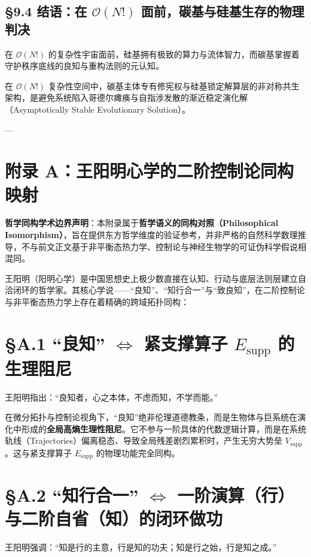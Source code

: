 \documentclass[11pt,a4paper,oneside]{ctexart}
\begin{document}
\subsection{§9.4 结语：在 $\mathcal{O}(N!)$ 面前，碳基与硅基生存的物理判决}

在 $\mathcal{O}(N!)$ 的复杂性宇宙面前，硅基拥有极致的算力与流体智力，而碳基掌握着守护秩序底线的良知与重构法则的元认知。


在 $\mathcal{O}(N!)$ 复杂性空间中，碳基主体专有修宪权与硅基锁定解算层的非对称共生架构，是避免系统陷入哥德尔瘫痪与自指涉发散的渐近稳定演化解（Asymptotically Stable Evolutionary Solution）。


---


\section{附录 A：王阳明心学的二阶控制论同构映射}

\begin{notebox}
\textbf{哲学同构学术边界声明}：本附录属于\textbf{哲学语义的同构对照（Philosophical Isomorphism）}，旨在提供东方哲学维度的验证参考，并非严格的自然科学数理推导，不与前文正文基于非平衡态热力学、控制论与神经生物学的可证伪科学假说相混同。
\end{notebox}

王阳明（阳明心学）是中国思想史上极少数直接在认知、行动与底层法则层建立自洽闭环的哲学家。其核心学说------“良知”、“知行合一”与“致良知”，在二阶控制论与非平衡态热力学上存在着精确的跨域拓扑同构：


\section{§A.1 “良知” $\Longleftrightarrow$ 紧支撑算子 $E_{\text{supp}}$ 的生理阻尼}
王阳明指出：“良知者，心之本体，不虑而知，不学而能。”

在微分拓扑与控制论视角下，“良知”绝非伦理道德教条，而是生物体与巨系统在演化中形成的\textbf{全局高熵生理性阻尼}。它不参与一阶具体的代数逻辑计算，而是在系统轨线（Trajectories）偏离稳态、导致全局残差剧烈累积时，产生无穷大势垒 $V_{\text{supp}}$。这与紧支撑算子 $E_{\text{supp}}$ 的物理功能完全同构。


\section{§A.2 “知行合一” $\Longleftrightarrow$ 一阶演算（行）与二阶自省（知）的闭环做功}
王阳明强调：“知是行的主意，行是知的功夫；知是行之始，行是知之成。”
\end{document}
